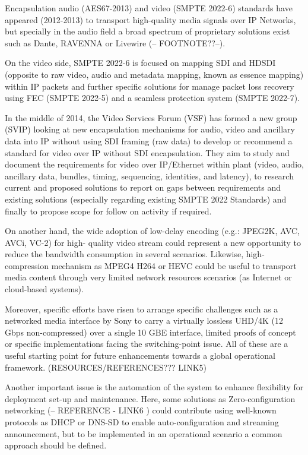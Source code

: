 Encapsulation audio (AES67-2013) and video (SMPTE 2022-6) standards have appeared (2012-2013) to transport high-quality media signals over IP Networks, but specially in the audio field a broad spectrum of proprietary solutions exist such as Dante, RAVENNA or Livewire (-- FOOTNOTE??--).

On the video side, SMPTE 2022-6 is focused on mapping SDI and HDSDI (opposite to raw video, audio and metadata mapping, known as essence mapping) within IP packets and further specific solutions for manage packet loss recovery using FEC (SMPTE 2022-5) and a seamless protection
system (SMPTE 2022-7).

In the middle of 2014, the Video Services Forum (VSF) has formed a new group (SVIP) looking at new encapsulation mechanisms for audio, video and ancillary data into IP without using SDI framing (raw data) to develop or recommend a standard for video over IP without SDI encapsulation.
They aim to study and document the requirements for video over IP/Ethernet within plant (video, audio, ancillary data, bundles, timing, sequencing, identities, and latency), to research current and proposed solutions to report on gaps between requirements and existing solutions (especially regarding existing SMPTE 2022 Standards) and finally to propose scope for follow on activity if required.

On another hand, the wide adoption of low-delay encoding (e.g.: JPEG2K, AVC, AVCi, VC-2) for high- quality video stream could represent a new opportunity to reduce the bandwidth consumption in several scenarios. Likewise, high-compression mechanism as MPEG4 H264 or HEVC could be
useful to transport media content through very limited network resources scenarios (as Internet or cloud-based systems).

Moreover, specific efforts have risen to arrange specific challenges such as a networked media interface by Sony to carry a virtually lossless UHD/4K (12 Gbps non-compressed) over a single 10 GBE interface, limited proofs of concept or specific implementations facing the switching-point issue. All of these are a useful starting point for future enhancements towards a global operational framework. (RESOURCES/REFERENCES??? LINK5)

Another important issue is the automation of the system to enhance flexibility for deployment set-up and maintenance. Here, some solutions as Zero-configuration networking (-- REFERENCE - LINK6 ) could contribute using well-known protocols as DHCP or DNS-SD to enable auto-configuration and streaming announcement, but to be implemented in an operational scenario a common approach should be
defined.

